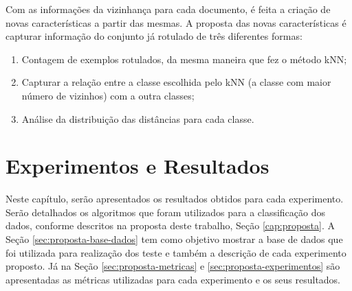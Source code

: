Com as informações da vizinhança para cada documento, é feita a criação de novas características a partir das mesmas. A proposta das novas características é capturar informação do conjunto já rotulado de três diferentes formas:

\begin{enumerate}
    \item Contagem de exemplos rotulados, da mesma maneira que fez o método kNN;
    \item Capturar a relação entre a classe escolhida pelo kNN (a classe com maior número de vizinhos) com a outra classes;
    \item Análise da distribuição das distâncias para cada classe.
\end{enumerate}


\chapter{Experimentos e Resultados}

Neste capítulo, serão apresentados os resultados obtidos para cada experimento. Serão detalhados os algoritmos que foram utilizados para a classificação dos dados, conforme descritos na proposta deste trabalho, Seção \ref{cap:proposta}. A Seção \ref{sec:proposta-base-dados} tem como objetivo mostrar a base de dados que foi utilizada para realização dos teste e também a descrição de cada experimento proposto. Já na Seção \ref{sec:proposta-metricas} e \ref{sec:proposta-experimentos} são apresentadas as métricas utilizadas para cada experimento e os seus resultados.  

